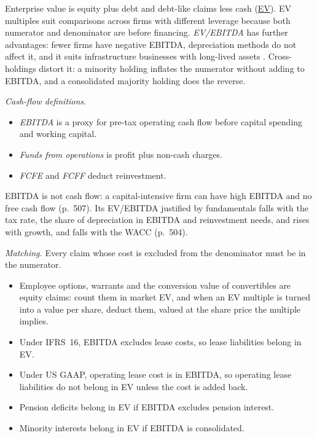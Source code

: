 \begin{qfmethod}\label{meth:enterprise-value-multiples}
 Enterprise value is equity plus debt and debt-like claims less cash (\hyperref[def:price-value-indicators]{EV}). EV multiples suit comparisons across firms with different leverage because both numerator and denominator are before financing. \emph{EV/EBITDA} has further advantages: fewer firms have negative EBITDA, depreciation methods do not affect it, and it suits infrastructure businesses with long-lived assets \citep[pp.~500--501, 507]{investment-valuation-2012}. Cross-holdings distort it: a minority holding inflates the numerator without adding to EBITDA, and a consolidated majority holding does the reverse.

\emph{Cash-flow definitions.}
\begin{itemize}
\item \emph{EBITDA} is a proxy for pre-tax operating cash flow before capital spending and working capital.
\item \emph{Funds from operations} is profit plus non-cash charges.
\item \emph{FCFE} and \emph{FCFF} deduct reinvestment.
\end{itemize}
EBITDA is not cash flow: a capital-intensive firm can have high EBITDA and no free cash flow (p.~507). Its EV/EBITDA justified by fundamentals falls with the tax rate, the share of depreciation in EBITDA and reinvestment needs, and rises with growth, and falls with the WACC (p.~504).

\emph{Matching.} Every claim whose cost is excluded from the denominator must be in the numerator.
\begin{itemize}
\item Employee options, warrants and the conversion value of convertibles are equity claims: count them in market EV, and when an EV multiple is turned into a value per share, deduct them, valued at the share price the multiple implies.
\item Under IFRS~16, EBITDA excludes lease costs, so lease liabilities belong in EV.
\item Under US GAAP, operating lease cost is in EBITDA, so operating lease liabilities do not belong in EV unless the cost is added back.
\item Pension deficits belong in EV if EBITDA excludes pension interest.
\item Minority interests belong in EV if EBITDA is consolidated.
\end{itemize}


\end{qfmethod}
